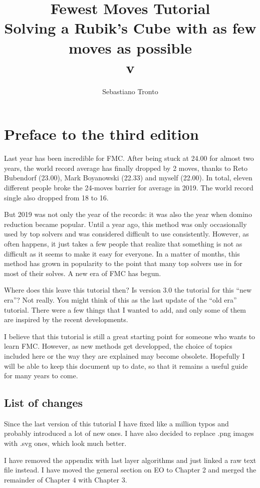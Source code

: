 \documentclass[11pt,a4paper]{book}
\author{Sebastiano Tronto}
\title{Fewest Moves Tutorial\\
\large Solving a Rubik's Cube with as few moves as possible\\
\small v\version}
\begin{document}
\maketitle

\section*{Preface to the third edition}

Last year has been incredible for FMC. After being stuck at 24.00 for almost two years, the world record average has finally dropped by 2 moves, thanks to Reto Bubendorf (23.00), Mark Boyanowski (22.33) and myself (22.00). In total, eleven different people broke the 24-moves barrier for average in 2019. The world record single also dropped from 18 to 16.

But 2019 was not only the year of the records: it was also the year when domino reduction became popular. Until a year ago, this method was only occasionally used by top solvers and was considered difficult to use consistently. However, as often happens, it just takes a few people that realize that something is not as difficult as it seems to make it easy for everyone. In a matter of months, this method has grown in popularity to the point that many top solvers use in for most of their solves. A new era of FMC has begun.

Where does this leave this tutorial then? Is version 3.0 the tutorial for this ``new era''? Not really. You might think of this as the last update of the ``old era'' tutorial. There were a few things that I wanted to add, and only some of them are inspired by the recent developments.

I believe that this tutorial is still a great starting point for someone who wants to learn FMC. However, as new methods get developped, the choice of topics included here or the way they are explained may become obsolete. Hopefully I will be able to keep this document up to date, so that it remains a useful guide for many years to come.

\subsection*{List of changes}

Since the last version of this tutorial I have fixed like a million typos and probably introduced a lot of new ones. I have also decided to replace .png images with .svg ones, which look much better.

I have removed the appendix with last layer algorithms and just linked a raw text file instead. I have moved the general section on EO to Chapter 2 and merged the remainder of Chapter 4 with Chapter 3.
\end{document}
